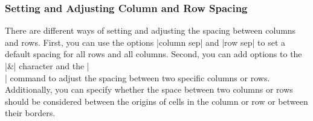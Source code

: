 \begin{codeexample}[]
\end{codeexample}


\subsubsection{Setting and Adjusting Column and Row Spacing}

There are different ways of setting and adjusting the spacing between columns
and rows. First, you can use the options |column sep| and |row sep| to set a
default spacing for all rows and all columns. Second, you can add options to
the |&| character and the |\\| command to adjust the spacing between two
specific columns or rows. Additionally, you can specify whether the space
between two columns or rows should be considered between the origins of cells
in the column or row or between their borders.

